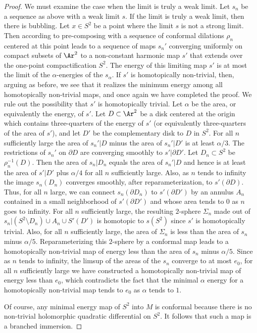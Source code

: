 \begin{proof}
We must examine the case when the limit is truly a weak limit. Let
$s_n$ be a sequence as above with a weak limit $s$. If the limit is
truly a weak limit, then there is bubbling. Let $x\in S^2$ be a
point where the limit $s$  is not a strong limit. Then according to
\cite{SacksUhlenbeck} pre-composing with a sequence of conformal
dilations $\rho_n$ centered at this point leads to a sequence of
maps $s_n'$ converging uniformly on compact subsets of $\Ar ^2$ to a
non-constant harmonic map $s'$ that extends over the one-point
compactification $S^2$. The energy of this limiting map $s'$ is at
most the limit of the $\alpha$-energies of the $s_\alpha$. If $s'$
is homotopically non-trivial, then, arguing as before, we see that
it realizes the minimum energy among all homotopically non-trivial
maps, and once again we have completed the proof. We rule out the
possibility that $s'$ is homotopically trivial. Let $\alpha$ be the
area, or equivalently the energy, of $s'$. Let $D\subset \Ar^2$ be a
disk centered at the origin which contains three-quarters of the
energy of $s'$ (or equivalently three-quarters of the area of $s'$),
and let $D'$ be the complementary disk to $D$ in $S^2$.  For all $n$
sufficiently large the area of $s_n'|D$ minus the area of $s_n'|D'$
is at least $\alpha/3$. The restrictions of $s_n'$ on $\partial D$
are converging smoothly to $s'|\partial D'$. Let $D_n\subset S^2$ be
$\rho_n^{-1}(D)$. Then the area of $s_n|D_n$ equals the area of
$s_n'|D$ and hence is at least the area of $s'|D'$ plus $\alpha/4$
for all $n$ sufficiently large. Also, as $n$ tends to infinity the
image $s_n(D_n)$ converges smoothly, after reparameterization, to
$s'(\partial D)$. Thus, for all $n$ large, we can connect
$s_n(\partial D_n)$ to $s'(\partial D')$ by an annulus $A_n$
contained in a small neighborhood of $s'(\partial D')$ and whose
area tends to $0$ as $n$ goes to infinity.  For all $n$ sufficiently
large, the resulting $2$-sphere $\Sigma_n$ made out of
$s_n|(S^2\setminus D_n)\cup A_n\cup S'(D')$ is homotopic to $s(S^2)$
since $s'$ is homotopically trivial. Also, for all $n$ sufficiently
large, the area of $\Sigma_n$ is less than the area of $s_n$ minus
$\alpha/5$. Reparameterizing this $2$-sphere by a conformal map
leads to a homotopically non-trivial map of energy less than the
area of $s_n$ minus $\alpha/5$. Since as $n$ tends to infinity, the
limsup of the areas of the $s_n$ converge to at most $e_0$, for all
$n$ sufficiently large we have constructed a homotopically
non-trivial map of energy less than $e_0$, which contradicts the
fact that the minimal $\alpha$ energy for a homotopically
non-trivial map tends to $e_0$ as $\alpha$ tends to $1$.


Of course, any minimal energy map of $S^2$ into $M$ is conformal because there
is no non-trivial holomorphic quadratic differential on $S^2$. It follows that
such a map is a branched immersion.
\end{proof}


